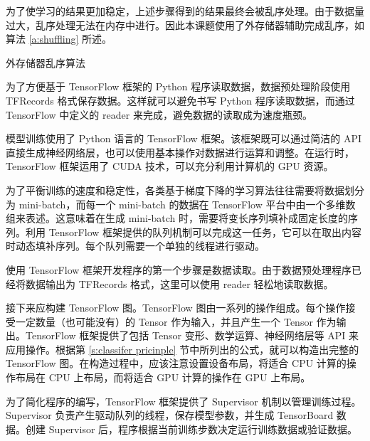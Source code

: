 为了使学习的结果更加稳定，上述步骤得到的结果最终会被乱序处理。由于数据量过大，乱序处理无法在内存中进行。因此本课题使用了外存储器辅助完成乱序，如算法 \ref{a:shuffling} 所述。

\begin{algorithm}[h]
	\caption{外存储器乱序算法}
	\label{a:shuffling}
\end{algorithm}

为了方便基于 TensorFlow 框架的 Python 程序读取数据，数据预处理阶段使用 TFRecords 格式保存数据。这样就可以避免书写 Python 程序读取数据，而通过 TensorFlow 中定义的 reader 来完成，避免数据的读取成为速度瓶颈。

\label{s:classifer training}
模型训练使用了 Python 语言的 TensorFlow 框架。该框架既可以通过简洁的 API 直接生成神经网络层，也可以使用基本操作对数据进行运算和调整。在运行时，TensorFlow 框架运用了 CUDA 技术，可以充分利用计算机的 GPU 资源。

为了平衡训练的速度和稳定性，各类基于梯度下降的学习算法往往需要将数据划分为 mini-batch，而每一个 mini-batch 的数据在 TensorFlow 平台中由一个多维数组来表述。这意味着在生成 mini-batch 时，需要将变长序列填补成固定长度的序列。利用 TensorFlow 框架提供的队列机制可以完成这一任务，它可以在取出内容时动态填补序列。每个队列需要一个单独的线程进行驱动。

使用 TensorFlow 框架开发程序的第一个步骤是数据读取。由于数据预处理程序已经将数据输出为 TFRecords 格式，这里可以使用 reader 轻松地读取数据。

接下来应构建 TensorFlow 图。TensorFlow 图由一系列的操作组成。每个操作接受一定数量（也可能没有）的 Tensor 作为输入，并且产生一个 Tensor 作为输出。TensorFlow 框架提供了包括 Tensor 变形、数学运算、神经网络层等 API 来应用操作。根据第 \ref{s:classifer pricinple} 节中所列出的公式，就可以构造出完整的 TensorFlow 图。在构造过程中，应该注意设置设备布局，将适合 CPU 计算的操作布局在 CPU 上布局，而将适合 GPU 计算的操作在 GPU 上布局。

为了简化程序的编写，TensorFlow 框架提供了 Supervisor 机制以管理训练过程。Supervisor 负责产生驱动队列的线程，保存模型参数，并生成 TensorBoard 数据。创建 Supervisor 后，程序根据当前训练步数决定运行训练数据或验证数据。

